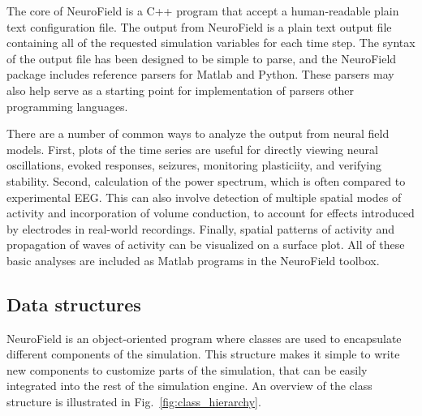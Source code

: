 \documentclass[preprint,review,10pt,authoryear,letterpaper]{elsarticle}
\begin{document}

The core of NeuroField is a C++ program that accept a human-readable plain text configuration file. The output from NeuroField is a plain text output file containing all of the requested simulation variables for each time step. The syntax of the output file has been designed to be simple to parse, and the NeuroField package includes reference parsers for Matlab and Python. These parsers may also help serve as a starting point for implementation of parsers other programming languages. 

There are a number of common ways to analyze the output from neural field models. First, plots of the time series are useful for directly viewing neural oscillations, evoked responses, seizures, monitoring plasticiity, and verifying stability. Second, calculation of the power spectrum, which is often compared to experimental EEG. This can also involve detection of multiple spatial modes of activity and incorporation of volume conduction, to account for effects introduced by electrodes in real-world recordings. Finally, spatial patterns of activity and propagation of waves of activity can be visualized on a surface plot. All of these basic analyses are included as Matlab programs in the NeuroField toolbox. 

\subsection{Data structures}
NeuroField is an object-oriented program where classes are used to encapsulate different components of the simulation. This structure makes it simple to write new components to customize parts of the simulation, that can be easily integrated into the rest of the simulation engine. An overview of the class structure is illustrated in Fig.~\ref{fig:class_hierarchy}. 
\end{document}
